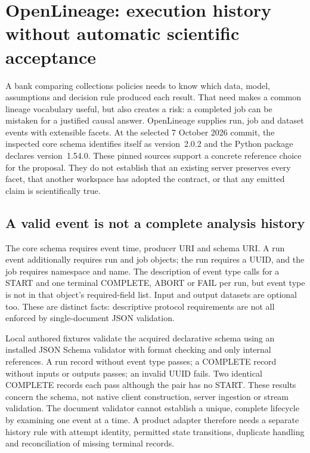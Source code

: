 \section{OpenLineage: execution history without automatic scientific acceptance}
\label{sec:exec24-openlineage-reuse}
A bank comparing collections policies needs to know which data, model,
assumptions and decision rule produced each result. That need makes a common
lineage vocabulary useful, but also creates a risk: a completed job can be
mistaken for a justified causal answer. OpenLineage supplies run, job and
dataset events with extensible facets. At the selected 7 October 2026 commit,
the inspected core schema identifies itself as version~2.0.2 and the Python
package declares version~1.54.0. These pinned sources support a concrete
reference choice for the proposal. They do not establish that an existing
server preserves every facet, that another workspace has adopted the
contract, or that any emitted claim is scientifically true.
\citep{exec24_openlineage_source}

\subsection{A valid event is not a complete analysis history}
The core schema requires event time, producer URI and schema URI. A run
event additionally requires run and job objects; the run requires a UUID,
and the job requires namespace and name. The description of event type
calls for a START and one terminal COMPLETE, ABORT or FAIL per run, but
event type is not in that object's required-field list. Input and output
datasets are optional too. These are distinct facts: descriptive protocol
requirements are not all enforced by single-document JSON validation.
\citep{exec24_openlineage_source}

Local authored fixtures validate the acquired declarative schema using an
installed JSON Schema validator with format checking and only internal
references. A run record without event type passes; a COMPLETE record without
inputs or outputs passes; an invalid UUID fails. Two identical COMPLETE
records each pass although the pair has no START. These results concern the
schema, not native client construction, server ingestion or stream validation.
The document validator cannot establish a unique, complete lifecycle by
examining one event at a time. A product adapter therefore needs a separate
history rule with attempt identity, permitted state transitions, duplicate
handling and reconciliation of missing terminal records.
\citep{exec24_openlineage_reference}

